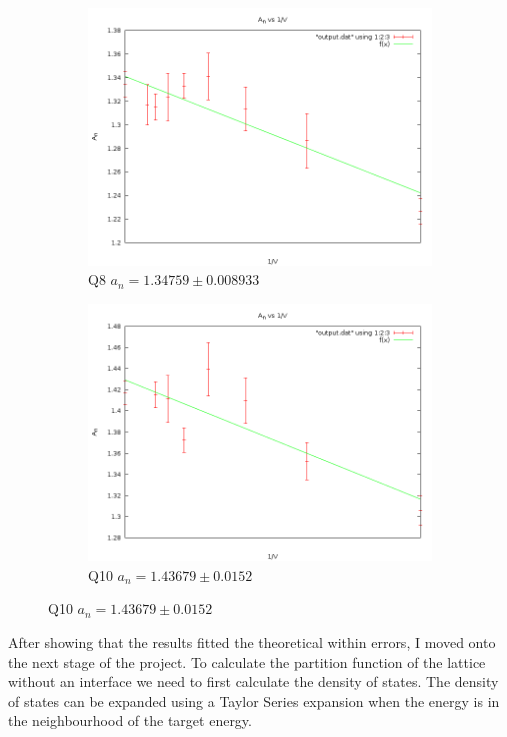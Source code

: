 \documentclass[10pt,a4paper]{article}
\begin{document}
\begin{figure}
\begin{subfigure}[b]{0.45\textwidth}
    \includegraphics[width=\textwidth]{q8variousgrid.png}
    \caption{Q8 $a_n = 1.34759 \pm 0.008933$}
\end{subfigure}
\begin{subfigure}[b]{0.45\textwidth}
    \includegraphics[width=\textwidth]{q10variousgrid.png}
    \caption{Q10 $a_n = 1.43679 \pm 0.0152$}
\end{subfigure}
\end{figure}

After showing that the results fitted the theoretical within errors, I moved onto the next stage of the project.
To calculate the partition function of the lattice without an interface we need to first calculate the density of states.
The density of states can be expanded using a Taylor Series expansion when the energy is in the neighbourhood of the target energy.
\end{document}
